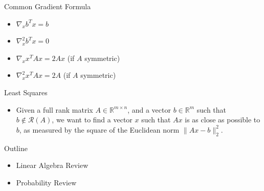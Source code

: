 \documentclass[aspectratio=169,12pt]{beamer}
\begin{document}
\begin{frame}[t]{Common Gradient Formula}
  \vspace{0.45cm}
  {\fontsize{18}{23}\selectfont
  \begin{itemize}
    \setlength{\itemsep}{0.52cm}
    \item $\nabla_x b^Tx=b$
    \item $\nabla_x^2 b^Tx=0$
    \item $\nabla_x x^TAx=2Ax$ (if $A$ symmetric)
    \item $\nabla_x^2 x^TAx=2A$ (if $A$ symmetric)
  \end{itemize}
  }
\end{frame}

\begin{frame}[t]{Least Squares}
  \vspace{0.62cm}
  {\large
  \begin{itemize}
    \item Given a full rank matrix $A\in\mathbb{R}^{m\times n}$, and a vector
          $b\in\mathbb{R}^{m}$ such that $b\notin\mathcal{R}(A)$, we want to find
          a vector $x$ such that $Ax$ is as close as possible to $b$, as measured
          by the square of the Euclidean norm $\|Ax-b\|_2^2$.
  \end{itemize}
  }
\end{frame}

\begin{frame}[t]{Outline}
  \vspace{1.10cm}
  {\fontsize{21}{26}\selectfont
  \begin{itemize}
    \setlength{\itemsep}{0.75cm}
    \item \textcolor{fadedgray}{Linear Algebra Review}
    \item Probability Review
  \end{itemize}}
\end{frame}
\end{document}
